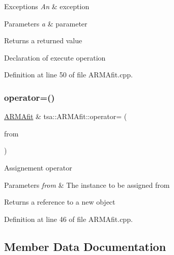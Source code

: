 \begin{DoxyExceptions}{Exceptions}
{\em An} & exception\\
\hline
\end{DoxyExceptions}

\begin{DoxyParams}{Parameters}
{\em a} & parameter\\
\hline
\end{DoxyParams}
\begin{DoxyReturn}{Returns}
a returned value
\end{DoxyReturn}
Declaration of execute operation 

Definition at line 50 of file A\+R\+M\+Afit.\+cpp.

\mbox{\label{classtsa_1_1_a_r_m_afit_a985bddf4c53ff0d8ceef060348baeb8c}} 
\subsubsection{\texorpdfstring{operator=()}{operator=()}}
{\footnotesize\ttfamily \hyperlink{classtsa_1_1_a_r_m_afit}{A\+R\+M\+Afit} \& tsa\+::\+A\+R\+M\+Afit\+::operator= (\begin{DoxyParamCaption}\item[{const \hyperlink{classtsa_1_1_a_r_m_afit}{A\+R\+M\+Afit} \&}]{from }\end{DoxyParamCaption})}

Assignement operator


\begin{DoxyParams}{Parameters}
{\em from} & The instance to be assigned from\\
\hline
\end{DoxyParams}
\begin{DoxyReturn}{Returns}
a reference to a new object 
\end{DoxyReturn}


Definition at line 46 of file A\+R\+M\+Afit.\+cpp.



\subsection{Member Data Documentation}
\mbox{\label{classtsa_1_1_a_r_m_afit_a7aae186f74f8278099f8affc538baaf0}} 
